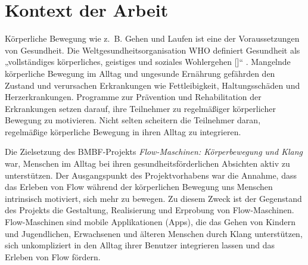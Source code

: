 

\section{Kontext der Arbeit} 

\label{sec:kontext_der_arbeit}

Körperliche Bewegung wie z.~B. Gehen und Laufen ist eine der Voraussetzungen von Gesundheit. Die Weltgesundheitsorganisation \acs{WHO} definiert Gesundheit als „vollständiges körperliches, geistiges und soziales Wohlergehen [\textellipsis]“ \citep[S.~100]{WorldHealthOrganization1948}. Mangelnde körperliche Bewegung im Alltag und ungesunde Ernährung gefährden den Zustand und verursachen Erkrankungen wie Fettleibigkeit, Haltungsschäden und Herzerkrankungen. Programme zur Prävention und Rehabilitation der Erkrankungen setzen darauf, ihre Teilnehmer zu regelmäßiger körperlicher Bewegung zu motivieren. Nicht selten scheitern die Teilnehmer daran, regelmäßige körperliche Bewegung in ihren Alltag zu integrieren.

Die Zielsetzung des \acs{BMBF}-Projekts \emph{Flow-Maschinen: Körperbewegung und Klang} war, Menschen im Alltag bei ihren gesundheitsförderlichen Absichten aktiv zu unterstützen. Der Ausgangspunkt des Projektvorhabens war die Annahme, dass das Erleben von Flow während der körperlichen Bewegung uns Menschen intrinsisch motiviert, sich mehr zu bewegen. Zu diesem Zweck ist der Gegenstand des Projekts die Gestaltung, Realisierung und Erprobung von Flow-Maschinen. Flow-Maschinen sind mobile Applikationen (Apps), die das Gehen von Kindern und Jugendlichen, Erwachsenen und älteren Menschen durch Klang unterstützen, sich unkompliziert in den Alltag ihrer Benutzer integrieren lassen und das Erleben von Flow fördern.

